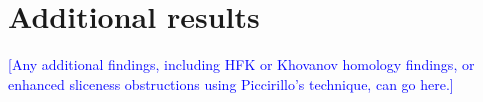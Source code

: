 \documentclass[11pt,usenames,dvipsnames,reqno]{amsart}
\numberwithin{theorem}{section}
\theoremstyle{ex}
\theoremstyle{rem}
\def\kh#1{\textcolor{Blue}{#1}}
\begin{document}
\section{Additional results}

\kh{[Any additional findings, including HFK or Khovanov homology findings, or enhanced sliceness obstructions using Piccirillo's technique, can go here.]}




\end{document}

